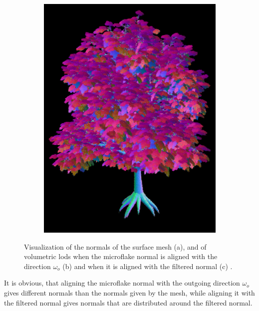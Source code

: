 \begin{figure}[ht]
\begin{subfigure}[b]{0.3\linewidth}
        \includegraphics[width=1\linewidth]{img/normal_map_vndf_normal_aligned.png}
        \caption{}
    \end{subfigure}
	\caption{Visualization of the normals of the surface mesh (a), and of volumetric \acsp{lod} when the microflake normal is aligned with the direction $\omega_o$ (b) and when it is aligned with the filtered normal (c) .}
	\label{fig:tree_normal_maps}
\end{figure}
It is obvious, that aligning the microflake normal with the outgoing direction $\omega_o$ gives different normals than the normals given by the mesh, while aligning it with the filtered normal gives normals that are distributed around the filtered normal.